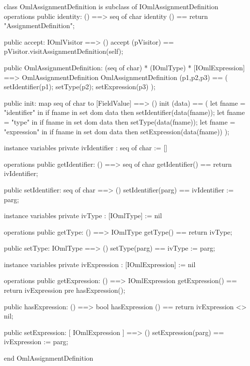 \begin{vdm_al}
class OmlAssignmentDefinition is subclass of IOmlAssignmentDefinition
operations
  public identity: () ==> seq of char
  identity () == return "AssignmentDefinition";

  public accept: IOmlVisitor ==> ()
  accept (pVisitor) == pVisitor.visitAssignmentDefinition(self);

  public OmlAssignmentDefinition:
      (seq of char) *
      (IOmlType) *
      [IOmlExpression] ==> OmlAssignmentDefinition
  OmlAssignmentDefinition (p1,p2,p3) == 
   ( setIdentifier(p1);
     setType(p2);
     setExpression(p3) );

  public init: map seq of char to [FieldValue] ==> ()
  init (data) ==
    ( let fname = "identifier" in
        if fname in set dom data
        then setIdentifier(data(fname));
      let fname = "type" in
        if fname in set dom data
        then setType(data(fname));
      let fname = "expression" in
        if fname in set dom data
        then setExpression(data(fname)) );

instance variables
  private ivIdentifier : seq of char := []

operations
  public getIdentifier: () ==> seq of char
  getIdentifier() == return ivIdentifier;

  public setIdentifier: seq of char ==> ()
  setIdentifier(parg) == ivIdentifier := parg;

instance variables
  private ivType : [IOmlType] := nil

operations
  public getType: () ==> IOmlType
  getType() == return ivType;

  public setType: IOmlType ==> ()
  setType(parg) == ivType := parg;

instance variables
  private ivExpression : [IOmlExpression] := nil

operations
  public getExpression: () ==> IOmlExpression
  getExpression() == return ivExpression
    pre hasExpression();

  public hasExpression: () ==> bool
  hasExpression () == return ivExpression <> nil;

  public setExpression: [ IOmlExpression ] ==> ()
  setExpression(parg) == ivExpression := parg;

end OmlAssignmentDefinition
\end{vdm_al}

